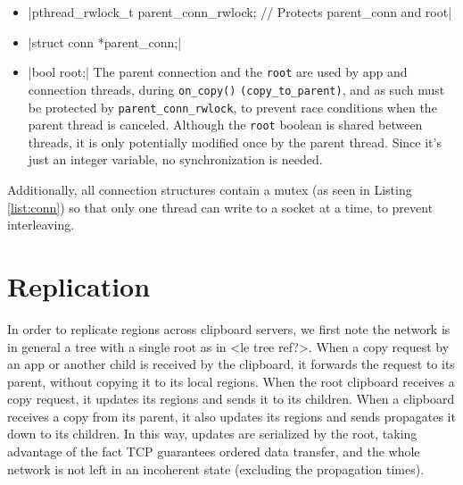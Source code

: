 \documentclass[a4paper, titlepage, english]{article}
\begin{document}
\begin{itemize}
	\item {}|pthread_rwlock_t parent_conn_rwlock; // Protects parent_conn and root|
	\item {}|struct conn *parent_conn;|
	\item {}|bool root;|
	  The parent connection and the \texttt{root} are used by app and connection threads, during \texttt{on\_copy()} \texttt{(copy\-\_to\_parent)}, and as such must be protected by \texttt{parent\_conn\_rwlock}, to prevent race conditions when the parent thread is canceled.
	Although the \texttt{root} boolean is shared between threads, it is only potentially modified once by the parent thread. Since it's just an integer variable, no synchronization is needed.
\end{itemize}
\par
Additionally, all connection structures contain a mutex (as seen in Listing \ref{list:conn}) so that only one thread can write to a socket at a time, to prevent interleaving.

\section{Replication}
\par
In order to replicate regions across clipboard servers, we first note the network is in general a tree with a single root as in <le tree ref?>. When a copy request by an app or another child is received by the clipboard, it forwards the request to its parent, without copying it to its local regions. When the root clipboard receives a copy request, it updates its regions and sends it to its children. When a clipboard receives a copy from its parent, it also updates its regions and sends propagates it down to its children. In this way, updates are serialized by the root, taking advantage of the fact TCP guarantees ordered data transfer, and the whole network is not left in an incoherent state (excluding the propagation times).
\end{document}
